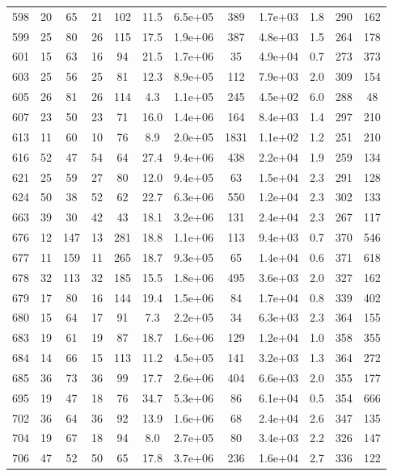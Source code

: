 \begin{table}
\begin{tabular}{cccccccccccc}
598 & 20 & 65 & 21 & 102 & 11.5 & 6.5e+05 & 389 & 1.7e+03 & 1.8 & 290 & 162 \\
599 & 25 & 80 & 26 & 115 & 17.5 & 1.9e+06 & 387 & 4.8e+03 & 1.5 & 264 & 178 \\
601 & 15 & 63 & 16 & 94 & 21.5 & 1.7e+06 & 35 & 4.9e+04 & 0.7 & 273 & 373 \\
603 & 25 & 56 & 25 & 81 & 12.3 & 8.9e+05 & 112 & 7.9e+03 & 2.0 & 309 & 154 \\
605 & 26 & 81 & 26 & 114 & 4.3 & 1.1e+05 & 245 & 4.5e+02 & 6.0 & 288 & 48 \\
607 & 23 & 50 & 23 & 71 & 16.0 & 1.4e+06 & 164 & 8.4e+03 & 1.4 & 297 & 210 \\
613 & 11 & 60 & 10 & 76 & 8.9 & 2.0e+05 & 1831 & 1.1e+02 & 1.2 & 251 & 210 \\
616 & 52 & 47 & 54 & 64 & 27.4 & 9.4e+06 & 438 & 2.2e+04 & 1.9 & 259 & 134 \\
621 & 25 & 59 & 27 & 80 & 12.0 & 9.4e+05 & 63 & 1.5e+04 & 2.3 & 291 & 128 \\
624 & 50 & 38 & 52 & 62 & 22.7 & 6.3e+06 & 550 & 1.2e+04 & 2.3 & 302 & 133 \\
663 & 39 & 30 & 42 & 43 & 18.1 & 3.2e+06 & 131 & 2.4e+04 & 2.3 & 267 & 117 \\
676 & 12 & 147 & 13 & 281 & 18.8 & 1.1e+06 & 113 & 9.4e+03 & 0.7 & 370 & 546 \\
677 & 11 & 159 & 11 & 265 & 18.7 & 9.3e+05 & 65 & 1.4e+04 & 0.6 & 371 & 618 \\
678 & 32 & 113 & 32 & 185 & 15.5 & 1.8e+06 & 495 & 3.6e+03 & 2.0 & 327 & 162 \\
679 & 17 & 80 & 16 & 144 & 19.4 & 1.5e+06 & 84 & 1.7e+04 & 0.8 & 339 & 402 \\
680 & 15 & 64 & 17 & 91 & 7.3 & 2.2e+05 & 34 & 6.3e+03 & 2.3 & 364 & 155 \\
683 & 19 & 61 & 19 & 87 & 18.7 & 1.6e+06 & 129 & 1.2e+04 & 1.0 & 358 & 355 \\
684 & 14 & 66 & 15 & 113 & 11.2 & 4.5e+05 & 141 & 3.2e+03 & 1.3 & 364 & 272 \\
685 & 36 & 73 & 36 & 99 & 17.7 & 2.6e+06 & 404 & 6.6e+03 & 2.0 & 355 & 177 \\
695 & 19 & 47 & 18 & 76 & 34.7 & 5.3e+06 & 86 & 6.1e+04 & 0.5 & 354 & 666 \\
702 & 36 & 64 & 36 & 92 & 13.9 & 1.6e+06 & 68 & 2.4e+04 & 2.6 & 347 & 135 \\
704 & 19 & 67 & 18 & 94 & 8.0 & 2.7e+05 & 80 & 3.4e+03 & 2.2 & 326 & 147 \\
706 & 47 & 52 & 50 & 65 & 17.8 & 3.7e+06 & 236 & 1.6e+04 & 2.7 & 336 & 122 \\

\end{tabular}
\end{table}
